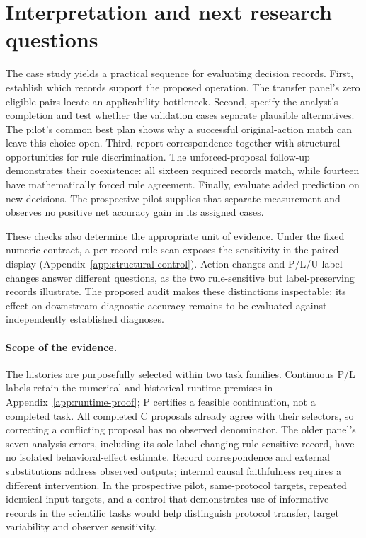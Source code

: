 \section{Interpretation and next research questions}
The case study yields a practical sequence for evaluating decision records.
First, establish which records support the proposed operation. The transfer
panel's zero eligible pairs locate an applicability bottleneck. Second,
specify the analyst's completion and test whether the validation cases
separate plausible alternatives. The pilot's common best plan shows why a
successful original-action match can leave this choice open. Third, report
correspondence together with structural opportunities for rule discrimination.
The unforced-proposal follow-up demonstrates their coexistence: all sixteen
required records match, while fourteen have mathematically forced rule
agreement. Finally, evaluate added prediction on new decisions. The prospective
pilot supplies that separate measurement and observes no positive net accuracy
gain in its assigned cases.

These checks also determine the appropriate unit of evidence. Under the fixed
numeric contract, a per-record rule scan exposes the sensitivity in the paired
display (Appendix~\ref{app:structural-control}). Action changes and P/L/U label
changes answer different questions, as the two rule-sensitive but
label-preserving records illustrate. The proposed audit makes these
distinctions inspectable; its effect on downstream diagnostic accuracy remains
to be evaluated against independently established diagnoses.

\paragraph{Scope of the evidence.}
The histories are purposefully selected within two task families. Continuous
P/L labels retain the numerical and historical-runtime premises in
Appendix~\ref{app:runtime-proof}; P certifies a feasible continuation, not a
completed task. All completed C proposals already agree with their selectors,
so correcting a conflicting proposal has no observed denominator. The older
panel's seven analysis errors, including its sole label-changing
rule-sensitive record, have no isolated behavioral-effect estimate. Record
correspondence and external substitutions address observed outputs; internal
causal faithfulness requires a different intervention. In the prospective
pilot, same-protocol targets, repeated identical-input targets, and a control
that demonstrates use of informative records in the scientific tasks would
help distinguish protocol transfer, target variability and observer sensitivity.

